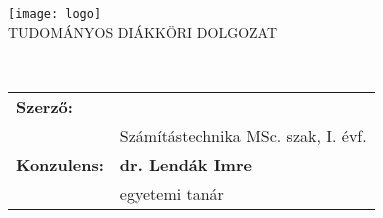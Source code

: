 \makeatletter
\renewcommand\maketitle{
{
\begin{center}
\texttt{[image: logo]} \\[4ex]
\Large \uppercase{Tudományos diákköri dolgozat}
\end{center}
\vspace{1cm}
\begin{center}
{\Huge \bfseries \uppercase{\@title} }\\
\vspace{2cm}
\newcolumntype{R}{>{\raggedleft\arraybackslash}X}%
\centering
\large{
\begin{tabularx}{\textwidth}{R X}
\textbf{Szerző:} &  \textbf{\@author} \\
         & Számítástechnika MSc. szak, I. évf. \\[4ex]
\textbf{Konzulens:} & \textbf{dr. Lendák Imre} \\
& egyetemi tanár
\end{tabularx}
}
\end{center}}
} %

\begin{titlepage}
\thispagestyle{fancy}
\fancyhf{}
\renewcommand{\headrulewidth}{0pt}
\maketitle
\end{titlepage}

